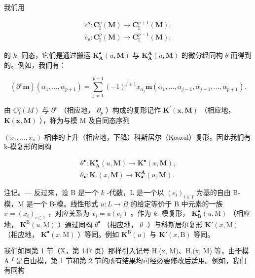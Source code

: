 我们用

\[
\begin{array}{l} \hat {c} ^ {p}: \mathbf {C} _ {\mathrm{I}} ^ {p} (\mathbf {M}) \to \mathbf {C} _ {\mathrm{I}} ^ {p + 1} (\mathbf {M}), \\ \hat {c} _ {p}: \mathbf {C} _ {\mathrm{I}} ^ {p} (\mathbf {M}) \to \mathbf {C} _ {\mathrm{I}} ^ {p - 1} (\mathbf {M}), \end{array}
\]

的 \(k\) -同态，它们是通过搬运 \(\mathbf{K}_{\mathbf{A}}^{\bullet}(u, \mathbf{M})\) 与 \(\mathbf{K}_{\mathbf{A}}^{\mathbf{A}}(u, \mathbf{M})\) 的微分经同构 \(\theta\) 而得到的。例如，我们有：

\[
\left(\partial^ {p} \boldsymbol {m}\right) \left(\alpha_ {1}, \dots , \alpha_ {p + 1}\right) = \sum_ {j = 1} ^ {p + 1} (- 1) ^ {j + 1} x _ {\alpha_ {j}} \boldsymbol {m} \left(\alpha_ {1}, \dots , \alpha_ {j - 1}, \alpha_ {j + 1}, \dots , \alpha_ {p + 1}\right).\tag{12}
\]

由 \(C_{I}^{p}(M)\) 与 \(\partial^{p}\) （相应地， \(\partial_{p}\) ）构成的复形记作 \(\mathbf{K}^{\prime}(\mathbf{x},\mathbf{M})\) （相应地， \(\mathbf{K}(\mathbf{x},\mathbf{M})\) ），称为与模 M 及自同态序列

\((x_{1}, \ldots, x_{n})\) 相伴的上升（相应地，下降）科斯居尔（Koszul）复形。因此我们有 k-模复形的同构

\[
\begin{array}{l} \theta^ {\bullet}: \mathbf {K} _ {\mathbf {A}} ^ {\bullet} (u, \mathbf {M}) \to \mathbf {K} ^ {\bullet} (x, \mathbf {M}), \\ \theta_ {\bullet}: \mathbf {K}. (x, \mathbf {M}) \to \mathbf {K} _ {\bullet} ^ {\mathbf {A}} (u, \mathbf {M}). \end{array}
\]

注记。--- 反过来，设 B 是一个 \(k\) -代数，L 是一个以 \((e_i)_{i \in I}\) 为基的自由 B-模，M 是一个 B-模。线性形式 \(u: L \to B\) 的给定等价于 B 中元素的一族 \(x = (x_i)_{i \in 1}\) ，对应关系为 \(x_i = u(e_i)\) 。作为 \(k\) -模复形， \(\mathbf{K}_{\mathrm{B}}^{\bullet}(u, \mathrm{M})\) （相应地， \(\mathbf{K}^{\mathrm{B}}(u, \mathrm{M})\) ）通过同构 \(\theta^{\bullet}\) （相应地， \(\theta\) .）与科斯居尔复形 \(\mathbf{K}'(x, \mathrm{M})\) （相应地， \(\mathbf{K}^{\bullet}(x, \mathrm{M})\) ）等同。例如 \(\mathbf{K}^{\mathrm{B}}(u)\) 与 \(\mathbf{K}'(x, \mathrm{B})\) 等同。

我们如同第 1 节（X，第 147 页）那样引入记号 H.(x, M)、H.(x, M) 等，由于模 A \(^{I}\) 是自由模，第 1 节和第 2 节的所有结果均可经必要修改后适用。例如，我们有同构

